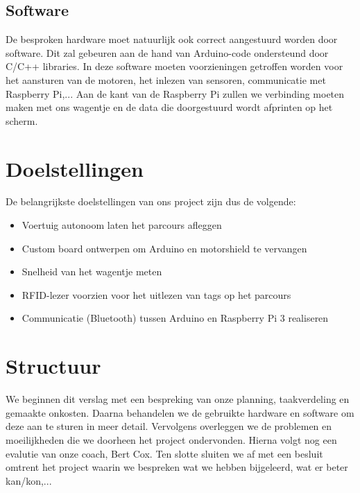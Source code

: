 \subsection{Software}
De besproken hardware moet natuurlijk ook correct aangestuurd worden door software. Dit zal gebeuren aan de hand van Arduino-code ondersteund door C/C++ libraries. In deze software moeten voorzieningen getroffen worden voor het aansturen van de motoren, het inlezen van sensoren, communicatie met Raspberry Pi,...
Aan de kant van de Raspberry Pi zullen we verbinding moeten maken met ons wagentje en de data die doorgestuurd wordt afprinten op het scherm.


\section{Doelstellingen}
De belangrijkste doelstellingen van ons project zijn dus de volgende:
\begin{itemize}
	\item Voertuig autonoom laten het parcours afleggen
	\item Custom board ontwerpen om Arduino en motorshield te vervangen
	\item Snelheid van het wagentje meten
	\item RFID-lezer voorzien voor het uitlezen van tags op het parcours
	\item Communicatie (Bluetooth) tussen Arduino en Raspberry Pi 3 realiseren
\end{itemize}
\section{Structuur}
We beginnen dit verslag met een bespreking van onze planning, taakverdeling en gemaakte onkosten. Daarna behandelen we de gebruikte hardware en software om deze aan te sturen in meer detail. Vervolgens overleggen we de problemen en moeilijkheden die we doorheen het project ondervonden. Hierna volgt nog een evalutie van onze coach, Bert Cox. Ten slotte sluiten we af met een besluit omtrent het project waarin we bespreken wat we hebben bijgeleerd, wat er beter kan/kon,...
